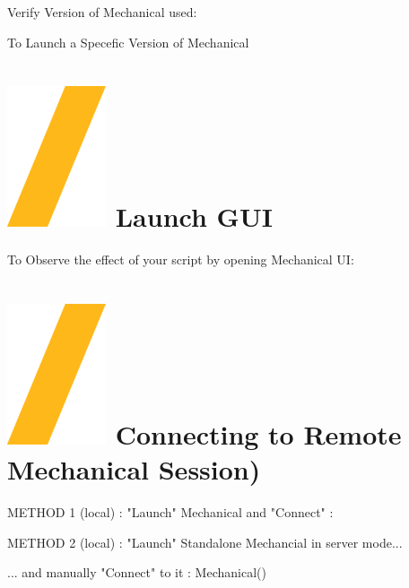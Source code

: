 \documentclass[9pt,landscape]{article}
\begin{document}
\begin{multicols}{3}
Verify Version of Mechanical used:


To Launch a Specefic Version of Mechanical



\section{\includegraphics[height=\fontcharht\font`\S]{slash.png} Launch GUI}

To Observe the effect of your script by opening Mechanical UI:



\vfill


\section{\includegraphics[height=\fontcharht\font`\S]{slash.png} Connecting to Remote Mechanical Session)}
METHOD 1 (local) :
"Launch" Mechanical and "Connect" :


METHOD 2 (local) :
"Launch" Standalone Mechancial in server mode...


... and manually "Connect" to it : Mechanical()


\end{multicols}
\end{document}
